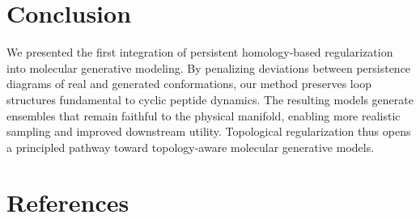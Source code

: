\documentclass[11pt]{article}
\begin{document}
\section{Conclusion}
We presented the first integration of persistent homology-based regularization into molecular generative modeling. By penalizing deviations between persistence diagrams of real and generated conformations, our method preserves loop structures fundamental to cyclic peptide dynamics. The resulting models generate ensembles that remain faithful to the physical manifold, enabling more realistic sampling and improved downstream utility. Topological regularization thus opens a principled pathway toward topology-aware molecular generative models.

\section*{References}
\end{document}

